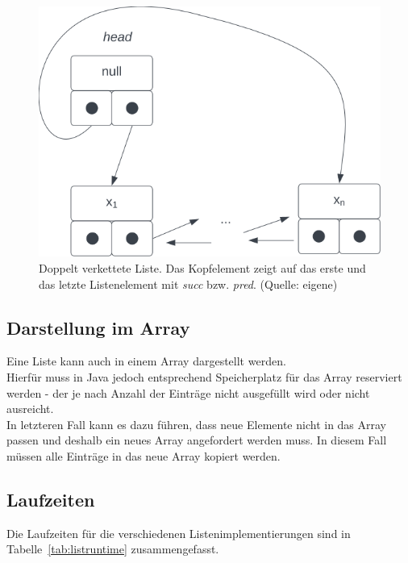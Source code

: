 \begin{figure}
    \begin{center}
        \includegraphics[scale=0.4]{chapters/Datenstrukturen und Algorithmen/img/doublelinkedlist}
        \caption{Doppelt verkettete Liste. Das Kopfelement zeigt auf das erste und das letzte Listenelement mit \textit{succ} bzw. \textit{pred}. (Quelle: eigene)}
        \label{fig:doublelinkedlist}
    \end{center}
\end{figure}

\subsection{Darstellung im Array}
Eine Liste kann auch in einem Array dargestellt werden.\\
Hierfür muss in Java jedoch entsprechend Speicherplatz für das Array reserviert werden - der je nach Anzahl der Einträge nicht ausgefüllt wird oder nicht ausreicht.\\
In letzteren Fall kann es dazu führen, dass neue Elemente nicht in das Array passen und deshalb ein neues Array angefordert werden muss.
In diesem Fall müssen alle Einträge in das neue Array kopiert werden.


\subsection{Laufzeiten}

Die Laufzeiten für die verschiedenen Listenimplementierungen sind in Tabelle~\ref{tab:listruntime} zusammengefasst.\\


